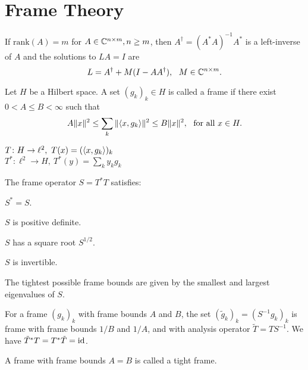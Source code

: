 \section{Frame Theory}

If $\text{rank}(A)=m$ for $A\in\mathbb{C}^{n\times m}, n\geq m$, then 
$A^\dagger = (A^*A)^{-1}A^*$ is a left-inverse of $A$ and the
solutions to $LA=I$ are 
$$L=A^\dagger+M(I-AA^\dagger), \ \ M\in \mathbb{C}^{n\times m}. $$

\begin{boxdefinition}[Frame]
	Let $H$ be a Hilbert space. A set $(g_k)_k\in H$ is called a frame
    if there exist $0<A\leq B<\infty$ such that
    $$A\|x\|^2\leq \sum_k\|\langle x,g_k\rangle\|^2\leq B\|x\|^2, 
    \ \ \text{for all } x\in H.$$
\end{boxdefinition}
\begin{boxdefinition}
    $T\colon H\to \ell^2, \ T(x)=(\langle x,g_k\rangle)_k$\\
    $T^*\colon \ell^2 \to H, \ T^*(y)=\sum_ky_kg_k$
\end{boxdefinition}

\begin{boxtheorem} 
    The frame operator $S=T^*T$ satisfies:
    \begin{listnr}
        \item $S^*=S$.
        \item $S$ is positive definite.
        \item $S$ has a square root $S^{1/2}.$
        \item $S$ is invertible.
    \end{listnr}
\end{boxtheorem}

\begin{boxtheorem}
    The tightest possible frame bounds are given by
    the smallest and largest eigenvalues of $S$.
\end{boxtheorem}

\begin{boxtheorem}
    For a frame $(g_k)_k$ with frame bounds $A$ and $B$,
    the set $(\tilde{g}_k)_k=(S^{-1}g_k)_k$ is frame with frame bounds 
    $1/B$ and $1/A$, and with analysis operator 
    $\tilde{T}=TS^{-1}$.
     We have $\tilde{T}^*T=T^*\tilde T=\operatorname*{id}$.
\end{boxtheorem}

\begin{boxdefinition}
    A frame with frame bounds $A=B$ is called a {tight frame.}
\end{boxdefinition}

